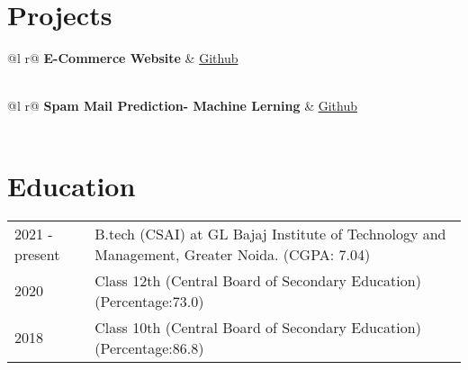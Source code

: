 \documentclass[a4paper,12pt]{article}
\begin{document}
\section{Projects}

\begin{tabularx}{\linewidth}{ @{}l r@{} }
\textbf{E-Commerce Website} & \hfill \href{https://some-link.com}{Github} \\[3.75pt]
  \\
\end{tabularx}

\begin{tabularx}{\linewidth}{ @{}l r@{} }
\textbf{Spam Mail Prediction- Machine Lerning} & \hfill \href{https://github.com/imvaibhav04/spam_mail_prediction_using_ML}{Github} \\[3.75pt]
 \\
\end{tabularx}

\section{Education}
\begin{tabularx}{\linewidth}{@{}l X@{}}	
2021 - present & B.tech (CSAI) at GL Bajaj Institute of Technology and Management, Greater Noida. \hfill \normalsize (CGPA: 7.04) \\


2020 & Class 12th (Central Board of Secondary Education) \hfill  (Percentage:73.0) \\

2018 & Class 10th (Central Board of Secondary Education)  \hfill  (Percentage:86.8) \\
\end{tabularx}
\end{document}
